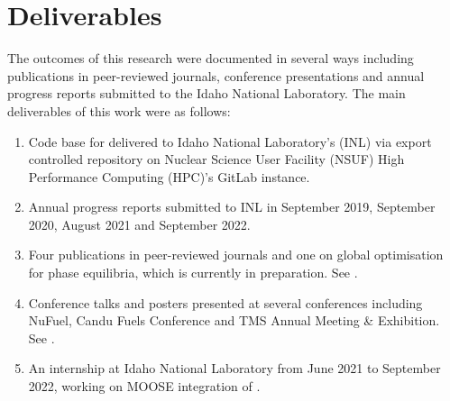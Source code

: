 \section{Deliverables}
	The outcomes of this research were documented in several ways including publications in peer-reviewed journals, conference presentations and annual progress reports submitted to the Idaho National Laboratory. The main deliverables of this work were as follows:
	\begin{enumerate}
	\item Code base for {\GEM} delivered to Idaho National Laboratory's (INL) via export controlled repository on Nuclear Science User Facility (NSUF) High Performance Computing (HPC)'s GitLab instance.
	\item Annual progress reports submitted to INL in September 2019, September 2020, August 2021 and September 2022. 
	\item Four publications in peer-reviewed journals and one on global optimisation for phase equilibria, which is currently in preparation. See .
	\item Conference talks and posters presented at several conferences including NuFuel, Candu Fuels Conference and TMS Annual Meeting \& Exhibition. See .
	\item An internship at Idaho National Laboratory from June 2021 to September 2022, working on MOOSE integration of \GEM.
	\end{enumerate}
	
